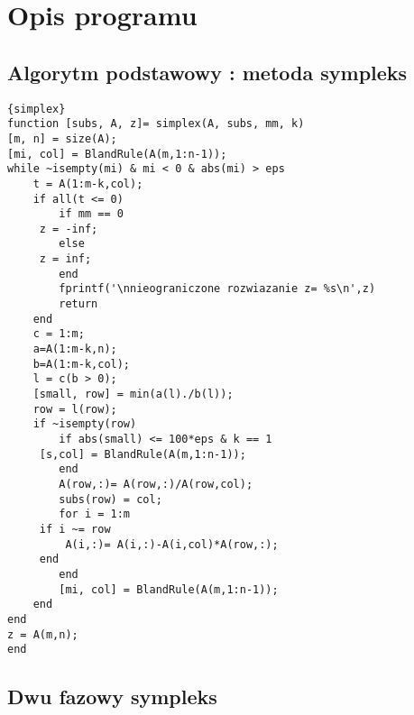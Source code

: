 \documentclass{classrep}
\begin{document}
\section{Opis programu}


\subsection{Algorytm podstawowy : metoda sympleks}

\begin{lstlisting}{simplex}
function [subs, A, z]= simplex(A, subs, mm, k)
[m, n] = size(A);
[mi, col] = BlandRule(A(m,1:n-1));
while ~isempty(mi) & mi < 0 & abs(mi) > eps
    t = A(1:m-k,col);
    if all(t <= 0)
        if mm == 0
     z = -inf;
        else
     z = inf;
        end
        fprintf('\nnieograniczone rozwiazanie z= %s\n',z)
        return
    end
    c = 1:m;
    a=A(1:m-k,n);
    b=A(1:m-k,col);
    l = c(b > 0);
    [small, row] = min(a(l)./b(l));
    row = l(row);
    if ~isempty(row)
        if abs(small) <= 100*eps & k == 1
     [s,col] = BlandRule(A(m,1:n-1));
        end
        A(row,:)= A(row,:)/A(row,col);
        subs(row) = col;
        for i = 1:m
     if i ~= row
         A(i,:)= A(i,:)-A(i,col)*A(row,:);
     end
        end
        [mi, col] = BlandRule(A(m,1:n-1));
    end
end
z = A(m,n);
end
\end{lstlisting}


\subsection{Dwu fazowy sympleks}
\end{document}
